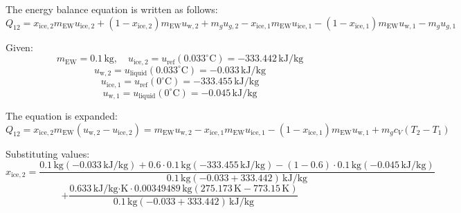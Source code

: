 The energy balance equation is written as follows:
\[
Q_{12} = x_{\text{ice},2} m_{\text{EW}} u_{\text{ice},2} + (1 - x_{\text{ice},2}) m_{\text{EW}} u_{\text{w},2} + m_g u_{g,2} - x_{\text{ice},1} m_{\text{EW}} u_{\text{ice},1} - (1 - x_{\text{ice},1}) m_{\text{EW}} u_{\text{w},1} - m_g u_{g,1}
\]

Given:
\[
m_{\text{EW}} = 0.1 \, \text{kg}, \quad u_{\text{ice},2} = u_{\text{ref}}(0.033^\circ\text{C}) = -333.442 \, \text{kJ/kg}
\]
\[
u_{\text{w},2} = u_{\text{liquid}}(0.033^\circ\text{C}) = -0.033 \, \text{kJ/kg}
\]
\[
u_{\text{ice},1} = u_{\text{ref}}(0^\circ\text{C}) = -333.455 \, \text{kJ/kg}
\]
\[
u_{\text{w},1} = u_{\text{liquid}}(0^\circ\text{C}) = -0.045 \, \text{kJ/kg}
\]

The equation is expanded:
\[
Q_{12} = x_{\text{ice},2} m_{\text{EW}} (u_{\text{w},2} - u_{\text{ice},2}) = m_{\text{EW}} u_{\text{w},2} - x_{\text{ice},1} m_{\text{EW}} u_{\text{ice},1} - (1 - x_{\text{ice},1}) m_{\text{EW}} u_{\text{w},1} + m_g c_V (T_2 - T_1)
\]

Substituting values:
\[
x_{\text{ice},2} = \frac{0.1 \, \text{kg} (-0.033 \, \text{kJ/kg}) + 0.6 \cdot 0.1 \, \text{kg} (-333.455 \, \text{kJ/kg}) - (1 - 0.6) \cdot 0.1 \, \text{kg} (-0.045 \, \text{kJ/kg})}{0.1 \, \text{kg} (-0.033 + 333.442) \, \text{kJ/kg}}
\]
\[
+ \frac{0.633 \, \text{kJ/kg·K} \cdot 0.00349489 \, \text{kg} (275.173 \, \text{K} - 773.15 \, \text{K})}{0.1 \, \text{kg} (-0.033 + 333.442) \, \text{kJ/kg}}
\]